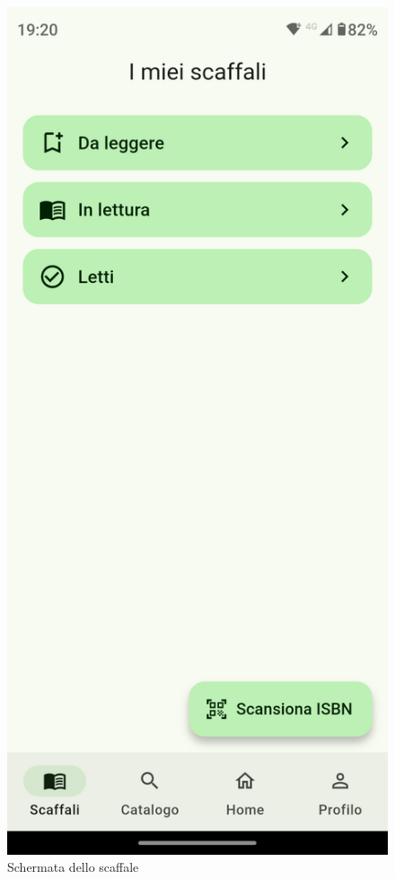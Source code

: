 \documentclass{article}
\begin{document}
\begin{figure}[H]
  \centering
  \includegraphics[width=0.6\linewidth]{shelf-f.png}
  \caption{Schermata dello scaffale}
  \label{fig:sitemap}
\end{figure}
\end{document}

